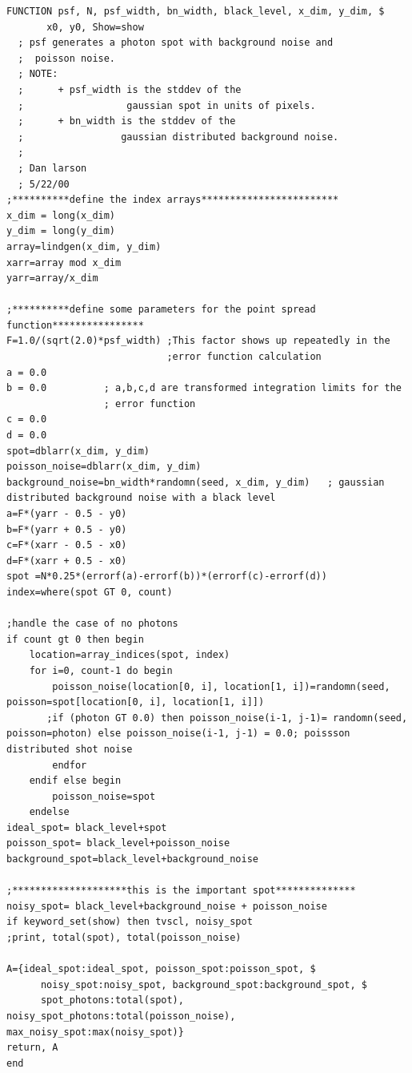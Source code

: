 {\tiny 
\begin{verbatim}
FUNCTION psf, N, psf_width, bn_width, black_level, x_dim, y_dim, $
       x0, y0, Show=show
  ; psf generates a photon spot with background noise and
  ;  poisson noise.
  ; NOTE:
  ;      + psf_width is the stddev of the
  ;                  gaussian spot in units of pixels.
  ;      + bn_width is the stddev of the
  ;                 gaussian distributed background noise.
  ;
  ; Dan larson
  ; 5/22/00
;**********define the index arrays************************
x_dim = long(x_dim)
y_dim = long(y_dim)
array=lindgen(x_dim, y_dim)
xarr=array mod x_dim
yarr=array/x_dim

;**********define some parameters for the point spread function****************
F=1.0/(sqrt(2.0)*psf_width) ;This factor shows up repeatedly in the
                            ;error function calculation
a = 0.0
b = 0.0          ; a,b,c,d are transformed integration limits for the
                 ; error function
c = 0.0
d = 0.0
spot=dblarr(x_dim, y_dim)
poisson_noise=dblarr(x_dim, y_dim)
background_noise=bn_width*randomn(seed, x_dim, y_dim)   ; gaussian
distributed background noise with a black level
a=F*(yarr - 0.5 - y0)
b=F*(yarr + 0.5 - y0)
c=F*(xarr - 0.5 - x0)
d=F*(xarr + 0.5 - x0)
spot =N*0.25*(errorf(a)-errorf(b))*(errorf(c)-errorf(d))
index=where(spot GT 0, count)

;handle the case of no photons
if count gt 0 then begin
    location=array_indices(spot, index)
    for i=0, count-1 do begin
        poisson_noise(location[0, i], location[1, i])=randomn(seed,
poisson=spot[location[0, i], location[1, i]])
       ;if (photon GT 0.0) then poisson_noise(i-1, j-1)= randomn(seed,
poisson=photon) else poisson_noise(i-1, j-1) = 0.0; poissson
distributed shot noise
        endfor
    endif else begin
        poisson_noise=spot
    endelse
ideal_spot= black_level+spot
poisson_spot= black_level+poisson_noise
background_spot=black_level+background_noise

;********************this is the important spot**************
noisy_spot= black_level+background_noise + poisson_noise
if keyword_set(show) then tvscl, noisy_spot
;print, total(spot), total(poisson_noise)

A={ideal_spot:ideal_spot, poisson_spot:poisson_spot, $
      noisy_spot:noisy_spot, background_spot:background_spot, $
      spot_photons:total(spot), noisy_spot_photons:total(poisson_noise), max_noisy_spot:max(noisy_spot)}
return, A
end
\end{verbatim}
}

